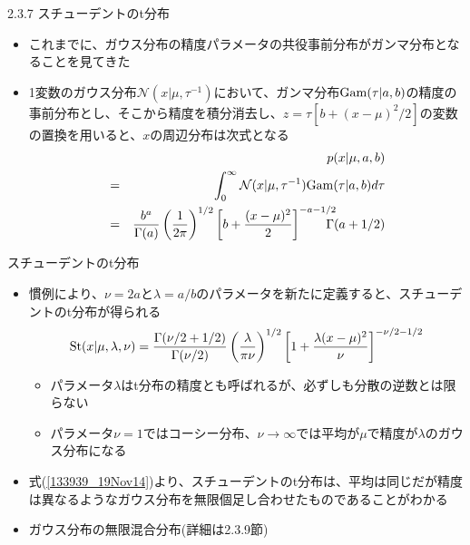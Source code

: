 \begin{frame}{2.3.7 スチューデントのt分布}
 \begin{itemize}
  \item これまでに、ガウス分布の精度パラメータの共役事前分布がガンマ分布となることを見てきた
  \item 1変数のガウス分布$\mathcal{N}(x|\mu, \tau^{-1})$において、ガンマ分布${\rm Gam}(\tau|a,b)$の精度の事前分布とし、そこから精度を積分消去し、$z=\tau[b+(x-\mu)^2/2]$の変数の置換を用いると、$x$の周辺分布は次式となる
        \begin{eqnarray}
         && p(x|\mu,a,b) \nonumber \\
         &=& \int_0^\infty \mathcal{N}(x|\mu,\tau^{-1}){\rm Gam}(\tau|a,b)d\tau\label{133939_19Nov14} \\
         &= & \frac{b^a}{\Gamma(a)}\left(\frac{1}{2\pi}\right)^{1/2}\left[b+\frac{(x-\mu)^2}{2}\right]^{-a-1/2}\!\!\!\!\!\!\Gamma(a+1/2)
        \end{eqnarray}
 \end{itemize}
\end{frame}

\begin{frame}{スチューデントのt分布}
 \begin{itemize}
  \item 慣例により、$\nu=2a$と$\lambda=a/b$のパラメータを新たに定義すると、\alert{スチューデントのt分布}が得られる
        \begin{equation}
         {\rm St}(x|\mu,\lambda,\nu) = \frac{\Gamma(\nu/2+1/2)}{\Gamma(\nu/2)}\left(\frac{\lambda}{\pi\nu}\right)^{1/2}\left[1+\frac{\lambda(x-\mu)^2}{\nu}\right]^{-\nu/2-1/2}
        \end{equation}
        \begin{itemize}
         \item パラメータ$\lambda$はt分布の精度とも呼ばれるが、必ずしも分散の逆数とは限らない
         \item パラメータ$\nu=1$ではコーシー分布、$\nu\rightarrow\infty$では平均が$\mu$で精度が$\lambda$のガウス分布になる
        \end{itemize}
  \item 式(\ref{133939_19Nov14})より、スチューデントのt分布は、平均は同じだが精度は異なるようなガウス分布を無限個足し合わせたものであることがわかる
  \item ガウス分布の無限混合分布(詳細は2.3.9節)
 \end{itemize}
\end{frame}



